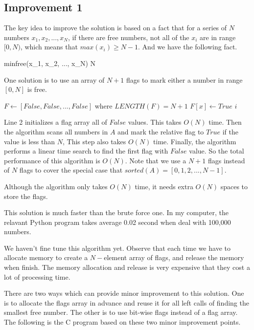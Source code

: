 \documentclass{article}
\begin{document}
\subsection{Improvement 1}
The key idea to improve the solution is based on a fact that for a
series of $N$ numbers $x_1, x_2, ..., x_N$, if there are free numbers,
not all of the $x_i$ are in range $[0, N)$, which means that 
$max(x_i) \geq N-1$. And we have the following fact.

\be
minfree(x_1, x_2, ..., x_N) \leq N
\label{min-free}
\ee

One solution is to use an array of $N+1$ flags to mark either a number
in range $[0, N]$ is free. 

\begin{algorithmic}[1]
  \State $F \gets [False, False, ..., False]$ where $LENGTH(F) = N+1$
      \State $F[x] \gets True$
    \EndIf
  \EndFor
      \State \Return $i$
    \EndIf
  \EndFor
\EndFunction
\end{algorithmic}

Line 2 initializes a flag array all of $False$ values. This takes
$O(N)$ time. Then the algorithm scans all numbers in $A$ and mark
the relative flag to $True$ if the value is less than $N$, This 
step also takes $O(N)$ time. Finally, the algorithm performs a
linear time search to find the first flag with $False$ value.
So the total performance of this algorithm is $O(N)$. Note that
we use a $N+1$ flags instead of $N$ flags to cover the special case
that $sorted(A) = [0, 1, 2, ..., N-1]$.

Although the algorithm only takes $O(N)$ time, it needs extra
$O(N)$ spaces to store the flags.

This solution is much faster than the brute force one. In my 
computer, the relavant Python program takes 
average 0.02 second when deal with 100,000 numbers.

We haven't fine tune this algorithm yet. Observe that each time 
we have to allocate memory to create a $N-$element array of 
flags, and release the memory when finish. 
The memory allocation and release is very
expensive that they cost a lot of processing time. 

There are two ways which can provide minor improvement to 
this solution. One is to allocate the flags array in advance
and reuse it for all left calls of finding the smallest free
number. The other is to use bit-wise flags instead of a flag 
array. The following is the C program based on these two
minor improvement points.
\end{document}
